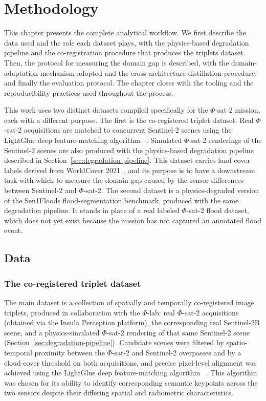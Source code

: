 \chapter{Methodology}
\label{chap:methodology}

This chapter presents the complete analytical workflow.
We first describe the data used and the role each dataset plays, with the physics-based degradation pipeline and the co-registration procedure that produces the triplets dataset.
Then, the protocol for measuring the domain gap is described, with the domain-adaptation mechanism adopted and the cross-architecture distillation procedure, and finally the evaluation protocol.
The chapter closes with the tooling and the reproducibility practices used throughout the process.

This work uses two distinct datasets compiled specifically for the $\Phi$-sat-2 mission, each with a different purpose.
The first is the co-registered triplet dataset.
Real $\Phi$-sat-2 acquisitions are matched to concurrent Sentinel-2 scenes using the LightGlue deep feature-matching algorithm ~\cite{Lindenberger_2023_ICCV}.
Simulated $\Phi$-sat-2 renderings of the Sentinel-2 scenes are also produced with the physics-based degradation pipeline described in Section~\ref{sec:degradation-pipeline}.
This dataset carries land-cover labels derived from  WorldCover 2021~\cite{zanaga2022worldcover}, and its purpose is to have a downstream task with which to measure the domain gap caused by the sensor differences between Sentinel-2 and $\Phi$-sat-2.
The second dataset is a physics-degraded version of the Sen1Floods flood-segmentation benchmark, produced with the same degradation pipeline.
It stands in place of a real labeled $\Phi$-sat-2 flood dataset, which does not yet exist because the mission has not captured an annotated flood event.

\section{Data}
\label{sec:data}

\subsection{The co-registered triplet dataset}
\label{sec:triplets}

The main dataset is a collection of spatially and temporally co-registered image triplets, produced in collaboration with the  $\Phi$-lab: real $\Phi$-sat-2 acquisitions (obtained via the  Insula Perception platform), the corresponding real Sentinel-2B scene, and a physics-simulated $\Phi$-sat-2 rendering of that same Sentinel-2 scene (Section~\ref{sec:degradation-pipeline}).
Candidate scenes were filtered by spatio-temporal proximity between the $\Phi$-sat-2 and Sentinel-2 overpasses and by a cloud-cover threshold on both acquisitions, and precise pixel-level alignment was achieved using the LightGlue deep feature-matching algorithm ~\cite{Lindenberger_2023_ICCV}.
This algorithm was chosen for its ability to identify corresponding semantic keypoints across the two sensors despite their differing spatial and radiometric characteristics.

